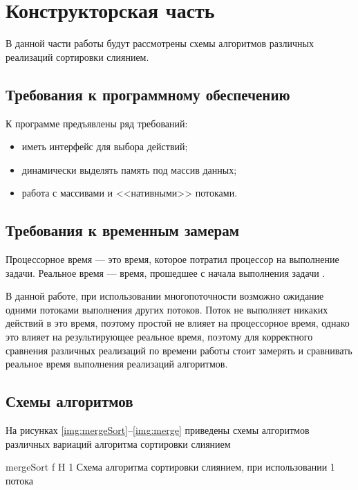 \chapter{Конструкторская часть}
В данной части работы будут рассмотрены схемы алгоритмов различных реализаций сортировки слиянием.

\section{Требования к программному обеспечению}

К программе предъявлены ряд требований:

\begin{itemize}
	\item иметь интерфейс для выбора действий;
	\item динамически выделять память под массив данных;
	\item работа с массивами и <<нативными>> потоками.
\end{itemize}

\section{Требования к временным замерам}
Процессорное время --- это время, которое потратил процессор  на выполнение задачи.
Реальное время --- время, прошедшее с начала выполнения задачи \cite{time}. 

В данной работе, при использовании многопоточности возможно
ожидание одними потоками выполнения других потоков. Поток не выполняет
никаких действий в это время, поэтому простой не влияет на процессорное время, однако это влияет на результирующее реальное время, поэтому для корректного сравнения различных реализаций  по времени работы стоит замерять и сравнивать реальное время
выполнения реализаций алгоритмов.

\section{Схемы алгоритмов}

На рисунках \ref{img:mergeSort}--\ref{img:merge} приведены схемы алгоритмов различных вариаций алгоритма сортировки слиянием

{mergeSort} %
{f} %
{H} %
{1\textwidth} %
{Схема алгоритма сортировки слиянием, при использовании 1 потока} %

